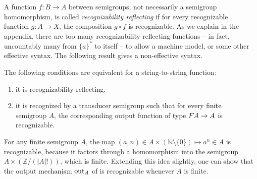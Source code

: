 A function $f\colon B \to A$ between semigroups, not necessarily a semigroup
homomorphism, is called \emph{recognizability reflecting} if for every
recognizable function $g\colon A \to X$, the composition $g \circ f$ is
recognizable. As we explain in the appendix, there are too many recognizability
reflecting functions -- in fact, uncountably many from $\{a\}^*$ to itself -- to
allow a machine model, or some other effective syntax. The following result
gives a non-effective syntax.

\begin{theorem}\label{thm:reco-reflecting-functions} The following conditions are equivalent for a string-to-string function:
 \begin{enumerate}
 \item \label{it:reco-refl} it is recognizability reflecting.
 \item \label{it:trans-semig-reco}it is recognized by a transducer semigroup such that for every finite semigroup $A$, the corresponding output function of type 
 $\functor A \to A$
 is recognizable.
 \end{enumerate}
\end{theorem}
\begin{example}\label{ex:squaring-reco-refl}
  For any finite semigroup $A$, the map $(a,n) \in A \times (\mathbb{N}\setminus\{0\}) \mapsto a^n \in A$ is recognizable, because it factors through a homomorphism into the semigroup $A \times (\mathbb{Z}/(|A|!))$, which is finite. Extending this idea slightly, one can show that the output mechanism $\mathrm{out}_A$ of  is recognizable whenever $A$ is finite.
\end{example}
